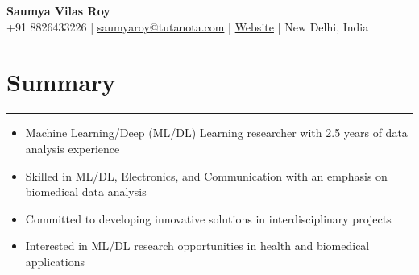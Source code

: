 \documentclass[11pt]{article}
\newlength{\sectionvspace}
\newlength{\sectionvspacee}
\begin{document}
	
	\begin{center}
		{\huge\bf Saumya Vilas Roy} \\
		
		\vspace{3mm} %
		{\large
			+91 8826433226 |
			\href{mailto:saumyaroy@tutanota.com}{saumyaroy@tutanota.com} |
			\href{https://caffineaddic.github.io/}{Website} |
			New Delhi, India
		} \\
		{
			
		}
	\end{center}
		\vspace{\sectionvspacee}
	\vspace{\sectionvspace}
	\section*{\bf Summary}
	\vspace{\sectionvspace}
	\rule{\textwidth}{0.4pt}
	\begin{itemize}[leftmargin=*,noitemsep,topsep=0pt]
		\item Machine Learning/Deep (ML/DL) Learning researcher with 2.5 years of data analysis experience
		\item Skilled in ML/DL, Electronics, and Communication with an emphasis on biomedical data analysis
		\item Committed to developing innovative solutions in interdisciplinary projects
		\item Interested in ML/DL research opportunities in health and biomedical applications
	\end{itemize}
	
		\vspace{\sectionvspacee}
\end{document}

